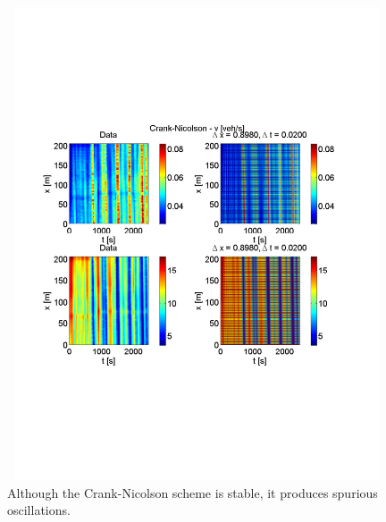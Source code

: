 \documentclass[letterpaper]{article}
\begin{document}
\begin{figure}[H]
\centering
\includegraphics[trim = 50mm 70mm 50mm 65mm, width = 120mm, height = 140mm]{CNrhov_dx_3_dt_45.pdf}
\caption{Although the Crank-Nicolson scheme is stable, it produces spurious oscillations. 
}
\label{fig:CNrho}
\end{figure}




\end{document}
